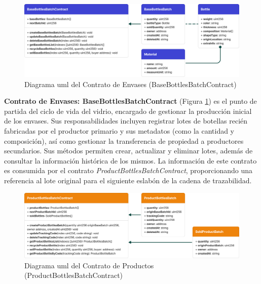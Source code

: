 \begin{figure}[!b]
    \centering
    \includegraphics[width=\linewidth]{Figures/uml-producer-contract.png}
    \caption{Diagrama \acrshort{uml} del Contrato de Envases (BaseBottlesBatchContract)}
    \label{fig:bottles-contract-uml}
\end{figure}

\textbf{Contrato de Envases: BaseBottlesBatchContract} (Figura \ref{fig:bottles-contract-uml})
 es el punto de partida del ciclo de vida del vidrio, encargado de gestionar la producción inicial de los envases. Sus responsabilidades incluyen registrar lotes de botellas recién fabricadas por el productor primario y sus metadatos (como la cantidad y composición), así como gestionar la transferencia de propiedad a productores secundarios. Sus métodos permiten crear, actualizar y eliminar lotes, además de consultar la información histórica de los mismos. La información de este contrato es consumida por el  contrato \textit{ProductBottlesBatchContract}, proporcionando una referencia al lote original para el siguiente eslabón de la cadena de trazabilidad.

\begin{figure}[!t]
    \centering
    \includegraphics[width=\linewidth]{Figures/uml-product-contract.png}
    \caption{Diagrama \acrshort{uml} del Contrato de Productos (ProductBottlesBatchContract)}
    \label{fig:product-contract-uml}
\end{figure}

